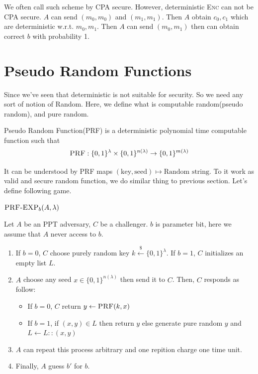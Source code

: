\documentclass[12pt, a4paper, openany, twoside]{book}
\theoremstyle{definition}
\theoremstyle{remark}
\theoremstyle{plain}
\numberwithin{equation}{section}
\begin{document}
We often call such scheme by \textsc{CPA} secure. However, deterministic \textsc{Enc} can not be \textsc{CPA} secure. 
$A$ can send $(m_0, m_0)$ and $(m_1, m_1)$. Then $A$ obtain $c_0, c_1$ which are deterministic w.r.t. $m_0, m_1$. Then $A$ can send $(m_0, m_1)$ then 
can obtain correct $b$ with probability 1. 

\newpage 

\section{Pseudo Random Functions}

Since we've seen that deterministic is not suitable for security. So we need any sort of notion of Random. 
Here, we define what is computable random(pseudo random), and pure random. 

\begin{tcolorbox}[colback=yellow!10!white,colframe=red!75!black,title=Pseudo Random Function]

Pseudo Random Function(\textsc{PRF}) is a deterministic polynomial time computable function such that 
\[\textsc{PRF}: \{0,1\}^\lambda \times \{0,1\}^{n(\lambda)} \rightarrow \{0,1\}^{m(\lambda)}\]

\end{tcolorbox}

It can be understood by \textsc{PRF} maps $(\text{key}, \text{seed}) \mapsto \text{Random string}$. 
To it work as valid and secure random function, we do similar thing to previous section. Let's define following game. 

\begin{tcolorbox}[colback=yellow!10!white,colframe=blue!75!white,title=Pseudo Random Function Experiments]

$\textsc{PRF-EXP}_b(A, \lambda)$

Let $A$ be an \textsc{PPT} adversary, $C$ be a challenger. $b$ is parameter bit, here we assume that $A$ never access to $b$. 

\begin{enumerate}
    \item If $b = 0$, $C$ choose purely random key $k \xleftarrow{\mathdollar} \{0,1\}^\lambda$. If $b = 1$, $C$ initializes an empty list $L$.
    \item $A$ choose any seed $x \in \{0,1\}^{n(\lambda)}$ then send it to $C$. Then, $C$ responds as follow: 
    \begin{itemize}
        \item If $b = 0$, $C$ return $y \gets \textsc{PRF}(k, x)$
        \item If $b = 1$, if $(x, y) \in L$ then return $y$ else generate pure random $y$ and $L \gets L :: (x, y)$
    \end{itemize}
    \item $A$ can repeat this process arbitrary and one repition charge one time unit.
    \item Finally, $A$ guess $b'$ for $b$. 
\end{enumerate}

\end{tcolorbox}
\end{document}
